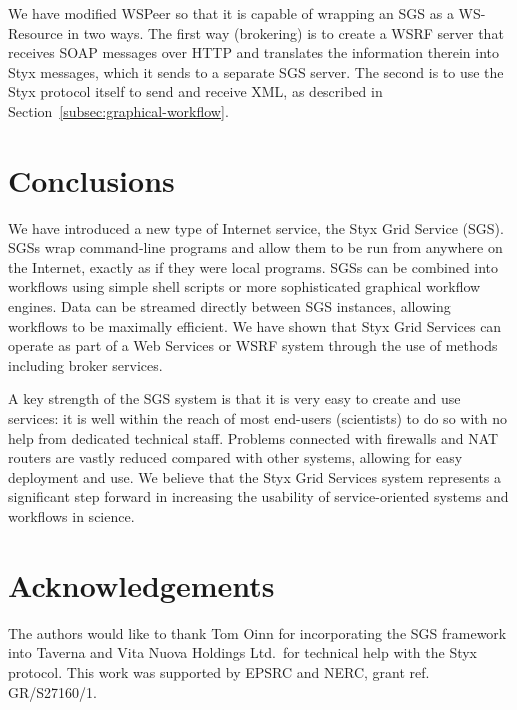 \documentclass{llncs}
\begin{document}
We have modified WSPeer so that it is capable of wrapping an SGS as a WS-Resource in two ways.  The first way (brokering) is to create a WSRF server that receives SOAP messages over HTTP and translates the information therein into Styx messages, which it sends to a separate SGS server.  The second is to use the Styx protocol itself to send and receive XML, as described in Section~\ref{subsec:graphical-workflow}.


\section{Conclusions}
We have introduced a new type of Internet service, the Styx Grid Service (SGS).  SGSs wrap command-line programs and allow them to be run from anywhere on the Internet, exactly as if they were local programs.  SGSs can be combined into workflows using simple shell scripts or more sophisticated graphical workflow engines.  Data can be streamed directly between SGS instances, allowing workflows to be maximally efficient.  We have shown that Styx Grid Services can operate as part of a Web Services or WSRF system through the use of methods including broker services.

A key strength of the SGS system is that it is very easy to create and use services: it is well within the reach of most end-users (scientists) to do so with no help from dedicated technical staff.  Problems connected with firewalls and NAT routers are vastly reduced compared with other systems, allowing for easy deployment and use.  We believe that the Styx Grid Services system represents a significant step forward in increasing the usability of service-oriented systems and workflows in science.
%

\section*{Acknowledgements}
The authors would like to thank Tom Oinn for incorporating the SGS framework into Taverna and Vita Nuova Holdings Ltd.\ for technical help with the Styx protocol.  This work was supported by EPSRC and NERC, grant ref. GR/S27160/1.

%
%


\end{document}

